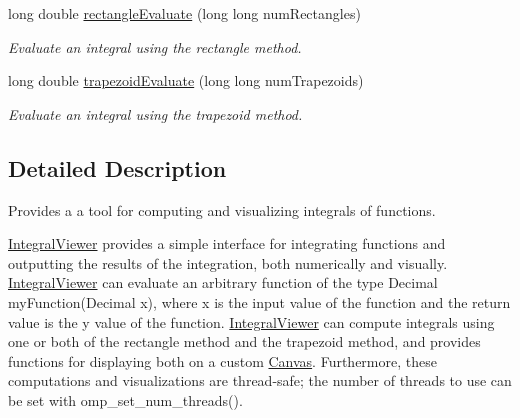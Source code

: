 \begin{DoxyCompactItemize}
long double \hyperlink{classtsgl_1_1_integral_viewer_a213d814ac293686ecd06c45344fa242f}{rectangle\-Evaluate} (long long num\-Rectangles)
\begin{DoxyCompactList}\small\item\em \-Evaluate an integral using the rectangle method. \end{DoxyCompactList}\item 
long double \hyperlink{classtsgl_1_1_integral_viewer_a485bd58c87267460baf013cdf786eae7}{trapezoid\-Evaluate} (long long num\-Trapezoids)
\begin{DoxyCompactList}\small\item\em \-Evaluate an integral using the trapezoid method. \end{DoxyCompactList}\end{DoxyCompactItemize}


\subsection{\-Detailed \-Description}
\-Provides a a tool for computing and visualizing integrals of functions. 

\hyperlink{classtsgl_1_1_integral_viewer}{\-Integral\-Viewer} provides a simple interface for integrating functions and outputting the results of the integration, both numerically and visually. \hyperlink{classtsgl_1_1_integral_viewer}{\-Integral\-Viewer} can evaluate an arbitrary function of the type {\ttfamily \-Decimal my\-Function(\-Decimal x)}, where x is the input value of the function and the return value is the y value of the function. \hyperlink{classtsgl_1_1_integral_viewer}{\-Integral\-Viewer} can compute integrals using one or both of the rectangle method and the trapezoid method, and provides functions for displaying both on a custom \hyperlink{classtsgl_1_1_canvas}{\-Canvas}. \-Furthermore, these computations and visualizations are thread-\/safe; the number of threads to use can be set with {\ttfamily omp\-\_\-set\-\_\-num\-\_\-threads()}. 

